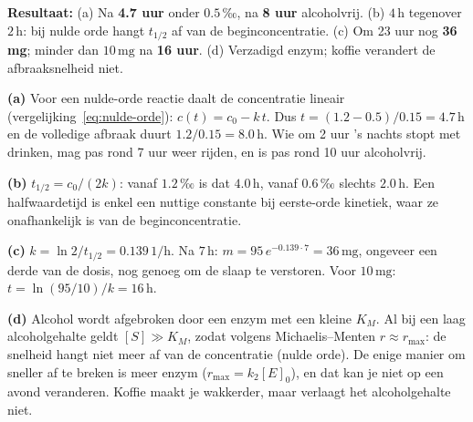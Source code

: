 \begin{oplossing}
\textbf{Resultaat:} (a) Na \textbf{4.7 uur} onder \(0.5\,\text{‰}\), na \textbf{8 uur} alcoholvrij. (b) \(4\,\mathrm{h}\) tegenover \(2\,\mathrm{h}\): bij nulde orde hangt \(t_{1/2}\) af van de beginconcentratie. (c) Om 23 uur nog \textbf{36 mg}; minder dan \(10\,\mathrm{mg}\) na \textbf{16 uur}. (d) Verzadigd enzym; koffie verandert de afbraaksnelheid niet.

\textbf{(a)} Voor een nulde-orde reactie daalt de concentratie lineair (vergelijking~\eqref{eq:nulde-orde}): \(c(t) = c_0 - k\,t\). Dus \(t = (1.2 - 0.5)/0.15 = 4.7\,\mathrm{h}\) en de volledige afbraak duurt \(1.2/0.15 = 8.0\,\mathrm{h}\). Wie om 2 uur 's nachts stopt met drinken, mag pas rond 7 uur weer rijden, en is pas rond 10 uur alcoholvrij.

\textbf{(b)} \(t_{1/2} = c_0/(2k)\): vanaf \(1.2\,\text{‰}\) is dat \(4.0\,\mathrm{h}\), vanaf \(0.6\,\text{‰}\) slechts \(2.0\,\mathrm{h}\). Een halfwaardetijd is enkel een nuttige constante bij eerste-orde kinetiek, waar ze onafhankelijk is van de beginconcentratie.

\textbf{(c)} \(k = \ln 2/t_{1/2} = 0.139\,\mathrm{1/h}\). Na \(7\,\mathrm{h}\): \(m = 95\,e^{-0.139\cdot 7} = 36\,\mathrm{mg}\), ongeveer een derde van de dosis, nog genoeg om de slaap te verstoren. Voor \(10\,\mathrm{mg}\): \(t = \ln(95/10)/k = 16\,\mathrm{h}\).

\textbf{(d)} Alcohol wordt afgebroken door een enzym met een kleine \(K_M\). Al bij een laag alcoholgehalte geldt \([S] \gg K_M\), zodat volgens Michaelis--Menten \(r \approx r_{\max}\): de snelheid hangt niet meer af van de concentratie (nulde orde). De enige manier om sneller af te breken is meer enzym (\(r_{\max} = k_2[E]_0\)), en dat kan je niet op een avond veranderen. Koffie maakt je wakkerder, maar verlaagt het alcoholgehalte niet.
\end{oplossing}


